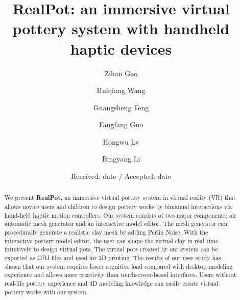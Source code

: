 \documentclass{svjour3}                     %
\begin{document}
\title{RealPot: an immersive virtual pottery system with handheld haptic devices
}


\author{Zihan Gao		\and
		Huiqiang Wang	\and
        Guangsheng Feng	\and
		Fangfang Guo 	\and
		Hongwu Lv 		\and
		Bingyang Li
}



\date{Received: date / Accepted: date}


\maketitle

\begin{abstract}
We present \textbf{RealPot}, an immersive virtual pottery system in virtual reality (VR) that allows novice users and children to design pottery works by bimanual interactions via hand-held haptic motion controllers.
Our system consists of two major components: an automatic mesh generator and an interactive model editor.
The mesh generator can procedurally generate a realistic clay mesh by adding Perlin Noise. With the interactive pottery model editor, the user can shape the virtual clay in real time intuitively to design virtual pots.
The virtual pots created by our system can be exported as OBJ files and used for 3D printing.
The results of our user study has shown that our system requires lower cognitive load compared with desktop modeling experience and allows more creativity than touchscreen-based interfaces. Users without real-life pottery experience and 3D modeling knowledge can easily create virtual pottery works with our system.

\end{abstract}
\end{document}
